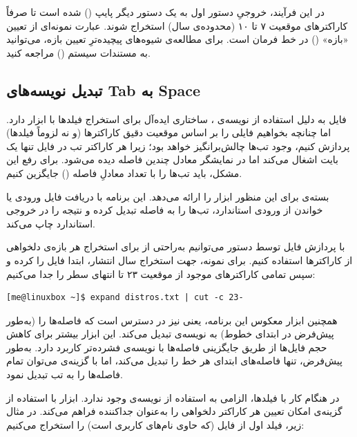 در این فرآیند، خروجیِ دستور اول به یک دستور  دیگر پایپ () شده است تا صرفاً کاراکترهای موقعیت ۷ تا ۱۰ (محدوده‌ی سال) استخراج شوند. عبارت  نمونه‌ای از تعیین «بازه» () در خط فرمان است. برای مطالعه‌ی شیوه‌های پیچیده‌ترِ تعیین بازه، می‌توانید به مستندات سیستم () مراجعه کنید.

\subsection{تبدیل نویسه‌های Tab به Space}

فایل  به دلیل استفاده از نویسه‌ی ، ساختاری ایده‌آل برای استخراج فیلدها با ابزار  دارد. اما چنانچه بخواهیم فایلی را بر اساس موقعیت دقیق کاراکترها (و نه لزوماً فیلدها) پردازش کنیم، وجود تب‌ها چالش‌برانگیز خواهد بود؛ زیرا هر کاراکتر تب در فایل تنها یک بایت اشغال می‌کند اما در نمایشگر معادل چندین فاصله دیده می‌شود. برای رفع این مشکل، باید تب‌ها را با تعداد معادلِ فاصله () جایگزین کنیم.

بسته‌ی  برای این منظور ابزار  را ارائه می‌دهد. این برنامه با دریافت فایل ورودی یا خواندن از ورودی استاندارد، تب‌ها را به فاصله تبدیل کرده و نتیجه را در خروجی استاندارد چاپ می‌کند.

با پردازش فایل  توسط دستور  می‌توانیم به‌راحتی از  برای استخراج هر بازه‌ی دلخواهی از کاراکترها استفاده کنیم. برای نمونه، جهت استخراج سال انتشار، ابتدا فایل را  کرده و سپس تمامی کاراکترهای موجود از موقعیت ۲۳ تا انتهای سطر را جدا می‌کنیم:

\begin{latin}
\begin{lstlisting}
[me@linuxbox ~]$ expand distros.txt | cut -c 23-
\end{lstlisting}
\end{latin}

همچنین ابزار معکوس این برنامه، یعنی  نیز در دسترس است که فاصله‌ها را (به‌طور پیش‌فرض در ابتدای خطوط) به نویسه‌ی  تبدیل می‌کند. این ابزار بیشتر برای کاهش حجم فایل‌ها از طریق جایگزینی فاصله‌ها با نویسه‌ی فشرده‌تر  کاربرد دارد. به‌طور پیش‌فرض،  تنها فاصله‌های ابتدای هر خط را تبدیل می‌کند، اما با گزینه‌ی  می‌توان تمام فاصله‌ها را به تب تبدیل نمود.

در هنگام کار با فیلدها، الزامی به استفاده از نویسه‌ی  وجود ندارد. ابزار  با استفاده از گزینه‌ی  امکان تعیین هر کاراکتر دلخواهی را به‌عنوان جداکننده فراهم می‌کند. در مثال زیر، فیلد اول از فایل  (که حاوی نام‌های کاربری است) را استخراج می‌کنیم:

